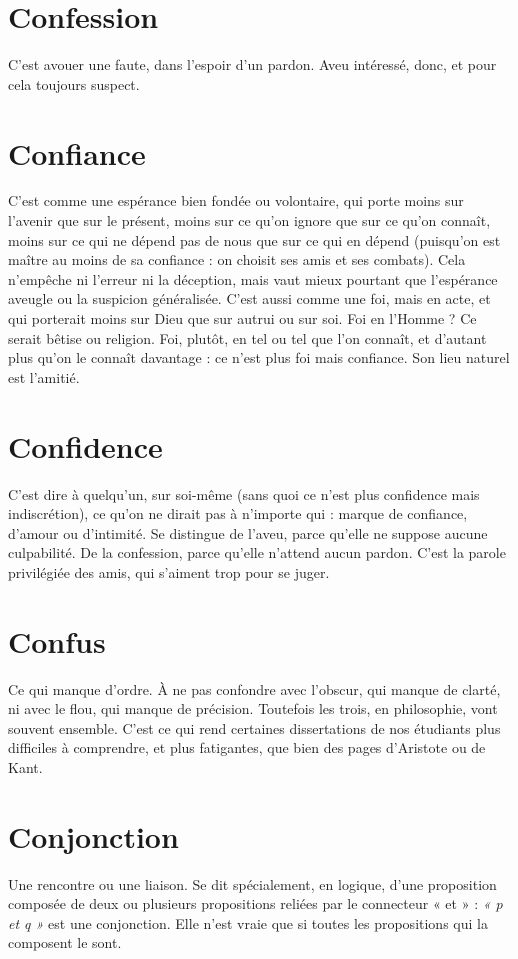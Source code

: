 \section{Confession}
C’est avouer une faute, dans l'espoir d’un pardon. Aveu
intéressé, donc, et pour cela toujours suspect.

\section{Confiance}
C’est comme une espérance bien fondée ou volontaire, qui
porte moins sur l’avenir que sur le présent, moins sur ce
qu’on ignore que sur ce qu’on connaît, moins sur ce qui ne dépend pas de nous
que sur ce qui en dépend (puisqu'on est maître au moins de sa confiance : on
choisit ses amis et ses combats). Cela n'empêche ni l'erreur ni la déception,
mais vaut mieux pourtant que l’espérance aveugle ou la suspicion généralisée.
C’est aussi comme une foi, mais en acte, et qui porterait moins sur Dieu
que sur autrui ou sur soi. Foi en l'Homme ? Ce serait bêtise ou religion. Foi,
plutôt, en tel ou tel que l’on connaît, et d’autant plus qu’on le connaît
davantage : ce n’est plus foi mais confiance. Son lieu naturel est l'amitié.

\section{Confidence}
C'est dire à quelqu'un, sur soi-même (sans quoi ce n’est plus
confidence mais indiscrétion), ce qu’on ne dirait pas à
n'importe qui : marque de confiance, d’amour ou d'intimité. Se distingue de
l’aveu, parce qu’elle ne suppose aucune culpabilité. De la confession, parce
qu’elle n’attend aucun pardon. C’est la parole privilégiée des amis, qui s’aiment
trop pour se juger.

\section{Confus}
Ce qui manque d’ordre. À ne pas confondre avec l’obscur, qui
manque de clarté, ni avec le flou, qui manque de précision. Toutefois
les trois, en philosophie, vont souvent ensemble. C’est ce qui rend certaines
dissertations de nos étudiants plus difficiles à comprendre, et plus fatigantes,
que bien des pages d’Aristote ou de Kant.

\section{Conjonction}
Une rencontre ou une liaison. Se dit spécialement, en
logique, d’une proposition composée de deux ou plusieurs
propositions reliées par le connecteur « et » : {\it « p et q »} est une conjonction.
Elle n’est vraie que si toutes les propositions qui la composent le sont.

